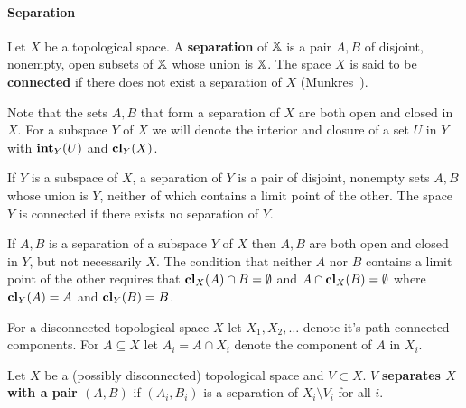 

\paragraph{Separation}

Let $X$ be a topological space. A \textbf{separation} of $\mathbb{X}$ is a pair $A, B$ of disjoint, nonempty, open subsets of $\mathbb{X}$ whose union is $\mathbb{X}$.
The space $X$ is said to be \textbf{connected} if there does not exist a separation of $X$ (Munkres~\cite{munkres00topology}).

Note that the sets $A, B$ that form a separation of $X$ are both open and closed in $X$.
For a subspace $Y$ of $X$ we will denote the interior and closure of a set $U$ in $Y$ with $\mathbf{int}_Y(U)$ and $\mathbf{cl}_Y(X)$.

\begin{lemma}
  If $Y$ is a subspace of $X$, a separation of $Y$ is a pair of disjoint, nonempty sets $A, B$ whose union is $Y$, neither of which contains a limit point of the other.
  The space $Y$ is connected if there exists no separation of $Y$.
\end{lemma}

If $A, B$ is a separation of a subspace $Y$ of $X$ then $A, B$ are both open and closed in $Y$, but not necessarily $X$.
The condition that neither $A$ nor $B$ contains a limit point of the other requires that $\mathbf{cl}_X(A)\cap B = \emptyset$ and $A\cap \mathbf{cl}_X(B) =\emptyset$ where $\mathbf{cl}_Y(A) = A$ and $\mathbf{cl}_Y(B) = B$.


For a disconnected topological space $X$ let $X_1, X_2, \ldots$ denote it's path-connected components.
For $A\subseteq X$ let $A_i = A\cap X_i$ denote the component of $A$ in $X_i$.

\begin{definition}
  Let $X$ be a (possibly disconnected) topological space and $V\subset X$.
  $V$ \textbf{separates $X$ with a pair $(A, B)$} if $(A_i, B_i)$ is a separation of $X_i\setminus V_i$ for all $i$.
\end{definition}

